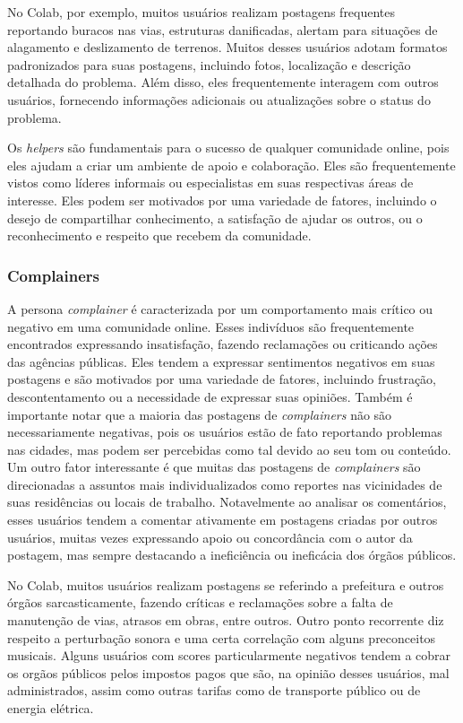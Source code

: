 No Colab, por exemplo, muitos usuários realizam postagens frequentes reportando buracos nas vias, estruturas danificadas, alertam para situações de alagamento e deslizamento de terrenos. Muitos desses usuários adotam formatos padronizados para suas postagens, incluindo fotos, localização e descrição detalhada do problema. Além disso, eles frequentemente interagem com outros usuários, fornecendo informações adicionais ou atualizações sobre o status do problema.

Os \textit{helpers} são fundamentais para o sucesso de qualquer comunidade online, pois eles ajudam a criar um ambiente de apoio e colaboração. Eles são frequentemente vistos como líderes informais ou especialistas em suas respectivas áreas de interesse. Eles podem ser motivados por uma variedade de fatores, incluindo o desejo de compartilhar conhecimento, a satisfação de ajudar os outros, ou o reconhecimento e respeito que recebem da comunidade.

\subsubsection*{Complainers}

A persona \textit{complainer} é caracterizada por um comportamento mais crítico ou negativo em uma comunidade online. Esses indivíduos são frequentemente encontrados expressando insatisfação, fazendo reclamações ou criticando ações das agências públicas. Eles tendem a expressar sentimentos negativos em suas postagens e são motivados por uma variedade de fatores, incluindo frustração, descontentamento ou a necessidade de expressar suas opiniões. Também é importante notar que a maioria das postagens de \textit{complainers} não são necessariamente negativas, pois os usuários estão de fato reportando problemas nas cidades, mas podem ser percebidas como tal devido ao seu tom ou conteúdo. Um outro fator interessante é que muitas das postagens de \textit{complainers} são direcionadas a assuntos mais individualizados como reportes nas vicinidades de suas residências ou locais de trabalho. Notavelmente ao analisar os comentários, esses usuários tendem a comentar ativamente em postagens criadas por outros usuários, muitas vezes expressando apoio ou concordância com o autor da postagem, mas sempre destacando a ineficiência ou ineficácia dos órgãos públicos.

No Colab, muitos usuários realizam postagens se referindo a prefeitura e outros órgãos sarcasticamente, fazendo críticas e reclamações sobre a falta de manutenção de vias, atrasos em obras, entre outros. Outro ponto recorrente diz respeito a perturbação sonora e uma certa correlação com alguns preconceitos musicais. Alguns usuários com scores particularmente negativos tendem a cobrar os orgãos públicos pelos impostos pagos que são, na opinião desses usuários, mal administrados, assim como outras tarifas como de transporte público ou de energia elétrica.

